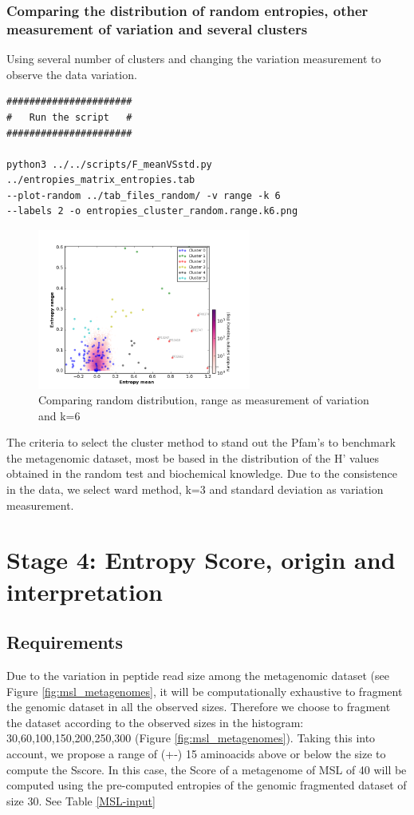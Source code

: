 \documentclass[a4paper,11pt]{report}
\begin{document}
\subsubsection{Comparing the distribution of random entropies, other measurement of variation and several clusters}
Using several number of clusters and changing the variation measurement to observe the data variation. 
\begin{verbatim}
######################
#   Run the script   #
######################

python3 ../../scripts/F_meanVSstd.py  ../entropies_matrix_entropies.tab 
--plot-random ../tab_files_random/ -v range -k 6
--labels 2 -o entropies_cluster_random.range.k6.png

\end{verbatim}
\begin{figure}[H]
  \centering
    \includegraphics[width=70mm, scale=1]{entropies_cluster_random_range_k6.png}
    \caption{Comparing random distribution, range as measurement of variation and k=6}
        \label{fig:range_random}
\end{figure}

The criteria to select the cluster method to stand out the Pfam’s to benchmark the metagenomic dataset,  most be based in the distribution of the H’ values obtained in the random test and biochemical knowledge. Due to the consistence in the data, we select ward method, k=3 and standard deviation as variation measurement. 

\section{Stage 4: Entropy Score, origin and interpretation}

\subsection{Requirements}

Due to the variation in peptide read size among the metagenomic dataset (see Figure \ref{fig:msl_metagenomes}, it will be computationally exhaustive to fragment the genomic dataset in all the observed sizes. Therefore we choose to fragment the dataset according to the observed sizes in the histogram: 30,60,100,150,200,250,300 (Figure \ref{fig:msl_metagenomes}). Taking this into account, we propose a range of (+-) 15 aminoacids above or below the size to compute the Sscore. In this case, the Score of  a metagenome of MSL of 40 will be computed using the pre-computed entropies of the genomic fragmented dataset of size 30. See Table \ref{MSL-input}
\end{document}
